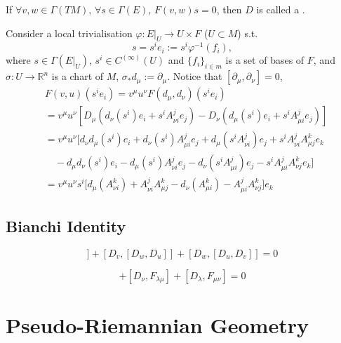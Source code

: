 \documentclass[openany, oneside, a5paper]{book}
\begin{document}
If $\forall v, w \in \Gamma(TM)$, $\forall s \in \Gamma(E)$, $F(v, w) s = 0$, then $D$ is called a .

Consider a local trivialisation $\varphi \colon E|_U \to U \times F$ ($U \subset M$) s.t.\ 
\begin{equation}
    s = s^i e_i := s^i\varphi^{-1}(f_i),
\end{equation}
where $s \in \Gamma(E|_U)$, $s^i \in C^{(\infty)}(U)$ and $\{f_i\}_{i \in m}$ is a set of bases of $F$,
and $\sigma \colon U \to \mathbb R^n$ is a chart of $M$, $\sigma_* d_\mu := \partial_\mu$.
Notice that $[\partial_\mu, \partial_\nu] = 0$,
\begin{equation}
    \begin{aligned}
        &F(v, u) (s^i e_i) 
        = v^\mu u^\nu F(d_\mu, d_\nu) (s^i e_i)
        \\
        &= v^\mu u^\nu [
            D_\mu (d_\nu(s^i)e_i + s^i A_{\nu i}^j e_j)
            - D_\nu (d_\mu(s^i)e_i + s^i A_{\mu i}^j e_j)
        ]
        \\
        &= v^\mu u^\nu \big[
            d_\nu d_\mu (s^i) e_i + d_\nu (s^i) A_{\mu i}^j e_j
            + d_\mu(s^i A_{\nu i}^j) e_j + s^i A_{\nu i}^j A_{\mu j}^k e_k
        \\
        &\quad
        - d_\mu d_\nu(s^i) e_i - d_\mu(s^i) A_{\nu i}^j e_j
        - d_\nu(s^i A_{\mu i}^j) e_j - s^i A_{\mu i}^j A_{\nu j}^k e_k
        \big]
        \\
        &= v^\mu u^\nu s^i\big[ 
            d_\mu (A_{\nu i}^k) + A_{\nu i}^j A_{\mu j}^k
            - d_\nu (A_{\mu i}^k) - A_{\mu i}^j A_{\nu j}^k 
        \big] e_k
    \end{aligned}
\end{equation}

\section{Bianchi Identity}

\begin{equation}
    [D_u, [D_v, D_w]] + [D_v, [D_w, D_u]] + [D_w, [D_u, D_v]] = 0
\end{equation}

\begin{equation}
    [D_\mu, F_{\nu \lambda}] + [D_\nu, F_{\lambda \mu}] + [D_\lambda, F_{\mu \nu}] = 0
\end{equation}

\chapter{Pseudo-Riemannian Geometry}
\end{document}
